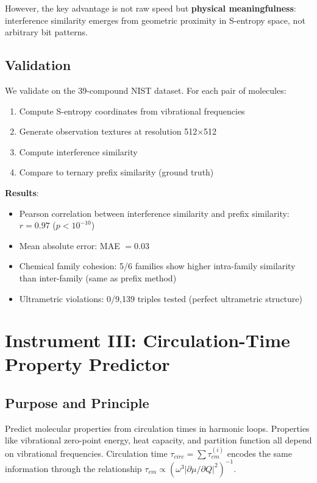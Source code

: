 \documentclass[11pt,a4paper]{article}
\theoremstyle{definition}
\theoremstyle{remark}
\begin{document}
However, the key advantage is not raw speed but \textbf{physical meaningfulness}: interference similarity emerges from geometric proximity in S-entropy space, not arbitrary bit patterns.

\subsection{Validation}

We validate on the 39-compound NIST dataset. For each pair of molecules:
\begin{enumerate}
\item Compute S-entropy coordinates from vibrational frequencies
\item Generate observation textures at resolution 512$\times$512
\item Compute interference similarity
\item Compare to ternary prefix similarity (ground truth)
\end{enumerate}

\textbf{Results}:
\begin{itemize}
\item Pearson correlation between interference similarity and prefix similarity: $r = 0.97$ ($p < 10^{-10}$)
\item Mean absolute error: MAE $= 0.03$
\item Chemical family cohesion: 5/6 families show higher intra-family similarity than inter-family (same as prefix method)
\item Ultrametric violations: 0/9,139 triples tested (perfect ultrametric structure)
\end{itemize}

\section{Instrument III: Circulation-Time Property Predictor}
\label{sec:instrument3}

\subsection{Purpose and Principle}

Predict molecular properties from circulation times in harmonic loops. Properties like vibrational zero-point energy, heat capacity, and partition function all depend on vibrational frequencies. Circulation time $\tau_{circ} = \sum \tau_{em}^{(i)}$ encodes the same information through the relationship $\tau_{em} \propto (\omega^3 |\partial\mu/\partial Q|^2)^{-1}$.
\end{document}
